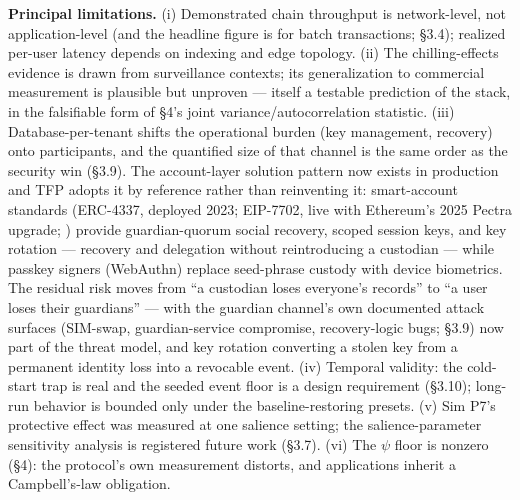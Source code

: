 \documentclass[
]{article}
\begin{document}
\textbf{Principal limitations.} (i) Demonstrated chain throughput is
network-level, not application-level (and the headline figure is for
batch transactions; §3.4); realized per-user latency depends on indexing
and edge topology. (ii) The chilling-effects evidence is drawn from
surveillance contexts; its generalization to commercial measurement is
plausible but unproven --- itself a testable prediction of the stack, in
the falsifiable form of §4's joint variance/autocorrelation statistic.
(iii) Database-per-tenant shifts the operational burden (key management,
recovery) onto participants, and the quantified size of that channel is
the same order as the security win (§3.9). The account-layer solution
pattern now exists in production and TFP adopts it by reference rather
than reinventing it: smart-account standards (ERC-4337, deployed 2023;
EIP-7702, live with Ethereum's 2025 Pectra upgrade; ) provide
guardian-quorum social recovery, scoped session keys, and key rotation
--- recovery and delegation without reintroducing a custodian --- while
passkey signers (WebAuthn) replace seed-phrase custody with device
biometrics. The residual risk moves from ``a custodian loses everyone's
records'' to ``a user loses their guardians'' --- with the guardian
channel's own documented attack surfaces (SIM-swap, guardian-service
compromise, recovery-logic bugs; §3.9) now part of the threat model, and
key rotation converting a stolen key from a permanent identity loss into
a revocable event. (iv) Temporal validity: the cold-start trap is real
and the seeded event floor is a design requirement (§3.10); long-run
behavior is bounded only under the baseline-restoring presets. (v) Sim
P7's protective effect was measured at one salience setting; the
salience-parameter sensitivity analysis is registered future work
(§3.7). (vi) The \(\psi\) floor is nonzero (§4): the protocol's own
measurement distorts, and applications inherit a Campbell's-law
obligation.
\end{document}
